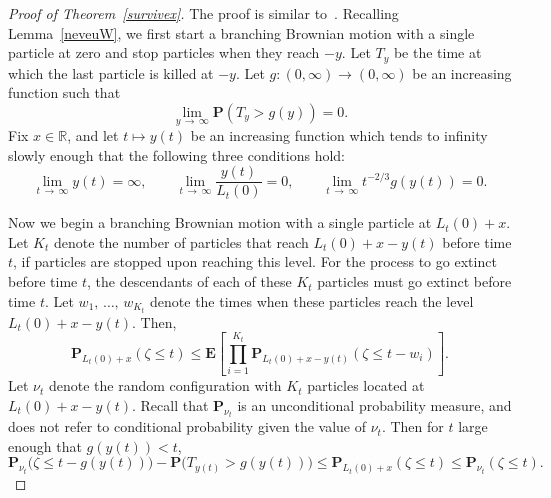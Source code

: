 \documentclass[AHL,Unicode,longabstracts,published]{cedram}
\newcommand*\E{\mathbf{E}}
\renewcommand*\P{\mathbf{P}}
\newcommand*\R{\mathbb{R}}
\newcommand{\1} {\mathds{1}}
\begin{document}
\begin{proof}[Proof of Theorem~\ref{survivex}]
The proof is similar to~\cite[the proof of Theorem~1]{bbs4}. Recalling Lemma~\ref{neveuW}, we first start a branching Brownian motion with a single particle at zero and stop particles when they reach $-y$. Let $T_y$ be the time at which the last particle is killed at $-y$. Let $g: (0, \infty) \rightarrow (0, \infty)$ be an increasing function such that
\begin{equation}\label{Tygy}
\lim_{y\,\rightarrow\,\infty} \P\left(T_y > g(y)\right) = 0.
\end{equation}
Fix $x \in \R$, and let $t \mapsto y(t)$ be an increasing function which tends to infinity slowly enough that the following three conditions hold:
\begin{equation}\label{ycond}
\lim_{t\,\rightarrow\,\infty} y(t) = \infty, \qquad \lim_{t\, \rightarrow\,\infty} \frac{y(t)}{L_t(0)} = 0, \qquad \lim_{t\,\rightarrow\,\infty} t^{-2/3} g(y(t)) = 0.
\end{equation}

Now we begin a branching Brownian motion with a single particle at $L_t(0) + x$. Let $K_t$ denote the number of particles that reach $L_t(0) + x - y(t)$ before time $t$, if particles are stopped upon reaching this level. For the process to go extinct before time $t$, the descendants of each of these $K_t$ particles must go extinct before time $t$.
Let $w_1,\,\dots,\,w_{K_t}$ denote the times when these particles reach the level $L_t(0) + x - y(t)$. Then,
\[
\P_{L_t(0) + x}(\zeta \leq t) \leq \E \left[\prod_{i=1}^{K_t} \P_{L_t(0) + x - y(t)}\left(\zeta \leq t - w_i\right) \right].
\]
Let $\nu_t$ denote the random configuration with $K_t$ particles located at $L_t(0) + x - y(t)$. Recall that $\P_{\nu_t}$ is an unconditional probability measure, and does not refer to conditional probability given the value of $\nu_t$. Then for $t$ large enough that $g(y(t)) < t$,
\begin{equation}\label{extsqueeze}
\P_{\nu_t}\big(\zeta \leq t - g(y(t))\big) - \P\big(T_{y(t)} > g(y(t))\big) \leq \P_{L_t(0) + x}(\zeta \leq t) \leq \P_{\nu_t}(\zeta \leq t).
\end{equation}


\end{proof}
\end{document}
